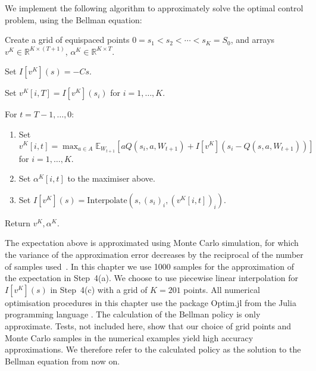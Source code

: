 \documentclass[main.tex]{subfiles}
\begin{document}
We implement the following algorithm to approximately solve the optimal control
problem, using the Bellman equation:
\begin{enumerate}
  \begin{samepage}
  \item Create a grid of equispaced points $0=s_1<s_2<\cdots<s_K=S_0$, and arrays $v^K\in\mathbb{R}^{K\times(T+1)}$,
    $\alpha^K\in\mathbb{R}^{K\times T}$.
  \item Set $I[v^K](s)=-Cs$.
  \item Set $v^K[i,T]=I[v^K](s_i)$ for $i=1,\dots, K$.
  \item For $t = T-1,\dots,0$:
    \begin{enumerate}
    \item Set $\displaystyle v^K[i,t]=\max_{a\in A}\mathbb{E}_{W_{t+1}}\left[ aQ(s_i,a,W_{t+1})
        +I[v^K](s_i-Q(s,a,W_{t+1}))\right]$\\ for $i=1,\dots,K$.
    \item Set $\alpha^K[i,t]$ to the maximiser above.
    \item Set $I[v^K](s) = \mathrm{Interpolate}(s, {(s_i)}_i,{(v^K[i,t])}_i)$.
    \end{enumerate}
  \item Return $v^K,\alpha^K$.
  \end{samepage}
\end{enumerate}
The expectation above is approximated using Monte Carlo simulation,
for which the variance of the approximation error decreases by the
reciprocal of the
number of samples used~\citep{caflisch1998monte}.
In this chapter we use \num{1000} samples for the approximation of the
expectation in Step~4(a).
We choose to use piecewise
linear interpolation for $I[v^K](s)$ in Step~4(c) with a grid of
$K=201$ points. All numerical optimisation procedures in this chapter
use the package Optim.jl \citep{mogensen2018optim} from the Julia
programming language \citep{bezanson2017julia}.
The calculation of the Bellman policy is only
approximate. Tests, not included here, show that our choice of grid points and Monte Carlo samples
in the numerical examples yield high accuracy approximations.
We therefore refer to the calculated policy as the solution to the
Bellman equation from now on.
\end{document}
